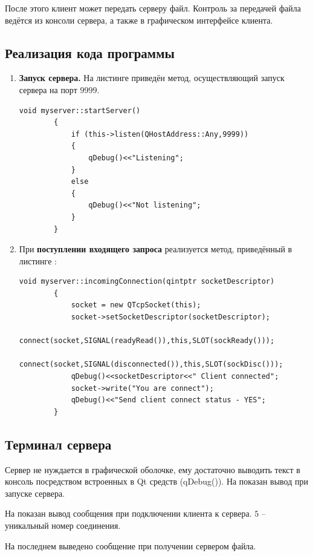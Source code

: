 \documentclass[../AISTR.tex]{subfiles}
\begin{document}
После этого клиент может передать серверу файл. Контроль за передачей файла ведётся из консоли сервера, а также в графическом интерфейсе клиента.

\subsection{Реализация кода программы}
\begin{enumerate}
	\item \textbf{Запуск сервера.} На листинге  приведён метод, осуществляющий запуск сервера на порт $9999$.
	\begin{lstlisting}[caption=Метод запуска сервера,captionpos=b, label={list:server_init}]
		void myserver::startServer()
		{
			if (this->listen(QHostAddress::Any,9999))
			{
				qDebug()<<"Listening";
			}
			else
			{
				qDebug()<<"Not listening";
			}
		}
	\end{lstlisting}
	\item При \textbf{поступлении входящего запроса} реализуется метод, приведённый в листинге :
	\begin{lstlisting}[caption=Метод входящего подключения,captionpos=b, label={list:server_connect}]
		void myserver::incomingConnection(qintptr socketDescriptor)
		{
			socket = new QTcpSocket(this);
			socket->setSocketDescriptor(socketDescriptor);
			connect(socket,SIGNAL(readyRead()),this,SLOT(sockReady()));
			connect(socket,SIGNAL(disconnected()),this,SLOT(sockDisc()));
			qDebug()<<socketDescriptor<<" Client connected";			
			socket->write("You are connect");
			qDebug()<<"Send client connect status - YES";
		}
	\end{lstlisting}
\end{enumerate}
\subsection{Терминал сервера}
Сервер не нуждается в графической оболочке, ему достаточно выводить текст в консоль посредством встроенных в Qt средств (qDebug()). На  показан вывод при запуске сервера.

На  показан вывод сообщения при подключении клиента к сервера. $5$ -- уникальный номер соединения. 

На последнем  выведено сообщение при получении сервером файла. 
 
\end{document}

